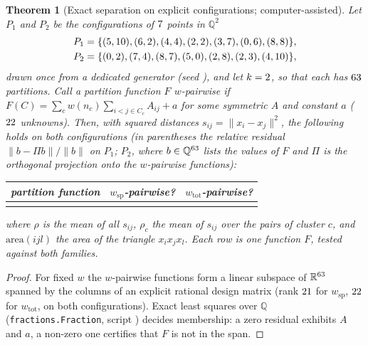 \documentclass[11pt,a4paper]{article}
\theoremstyle{plain}
\newtheorem{theorem}{Theorem}[section]
\theoremstyle{definition}
\theoremstyle{remark}
\newcommand{\R}{\mathbb{R}}
\newcommand{\Q}{\mathbb{Q}}
\newcommand{\spec}{\mathrm{sp}}
\newcommand{\tot}{\mathrm{tot}}
\begin{document}
\begin{theorem}[Exact separation on explicit configurations; computer-assisted]\label{thm:e4}
Let $P_1$ and $P_2$ be the configurations of $7$ points in $\Q^2$
\begin{gather*}
P_1=\{(5,10), (6,2), (4,4), (2,2), (3,7), (0,6), (8,8)\},\\
P_2=\{(0,2), (7,4), (8,7), (5,0), (2,8), (2,3), (4,10)\},
\end{gather*}
drawn once from a dedicated generator (seed \EfourSeed), and let $k=2$, so that each has $63$ partitions. Call a partition function $F$ \emph{$w$-pairwise} if $F(C)=\sum_cw(n_c)\sum_{i<j\in C_c}A_{ij}+a$ for some symmetric $A$ and constant $a$ ($22$ unknowns). Then, with squared distances $s_{ij}=\lVert x_i-x_j\rVert^2$, the following holds on both configurations (in parentheses the relative residual $\lVert b-\Pi b\rVert/\lVert b\rVert$ on $P_1$; $P_2$, where $b\in\Q^{\EfourPartitions}$ lists the values of $F$ and $\Pi$ is the orthogonal projection onto the $w$-pairwise functions):
\begin{center}\footnotesize
\setlength{\tabcolsep}{4pt}
\begin{tabular}{lcc}
\toprule
partition function & $w_\spec$-pairwise? & $w_\tot$-pairwise?\\
\midrule
\\
\bottomrule
\end{tabular}
\end{center}
where $\rho$ is the mean of all $s_{ij}$, $\rho_c$ the mean of $s_{ij}$ over the pairs of cluster $c$, and $\mathrm{area}(ijl)$ the area of the triangle $x_ix_jx_l$. Each row is one function $F$, tested against both families.
\end{theorem}
\begin{proof}
For fixed $w$ the $w$-pairwise functions form a linear subspace of $\R^{\EfourPartitions}$ spanned by the columns of an explicit rational design matrix (rank $21$ for $w_\spec$, $22$ for $w_\tot$, on both configurations). Exact least squares over $\Q$ (\texttt{fractions.Fraction}, script ) decides membership: a zero residual exhibits $A$ and $a$, a non-zero one certifies that $F$ is not in the span.
\end{proof}
\end{document}
